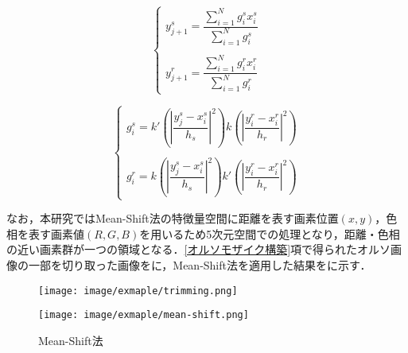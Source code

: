       \begin{equation}
        \label{Mean-Shift法2}
        \left\{
          \begin{array}{l}
            y_{j+1}^s = 
              \dfrac{\sum_{i=1}^{N} g_{i}^s x_{i}^s} {\sum_{i=1}^{N} g_{i}^s} \\ \\
            y_{j+1}^r = 
              \dfrac{\sum_{i=1}^{N} g_{i}^r x_{i}^r} {\sum_{i=1}^{N} g_{i}^r}
          \end{array}
        \right.
      \end{equation}

      \begin{equation}
        \label{Mean-Shift法3}
        \left\{
          \begin{array}{l}
            g_{i}^s = k' (|\dfrac{y_{j}^s - x_{i}^s} {h_{s}}|^2)
              k  (|\dfrac{y_{i}^r - x_{i}^r} {h_{r}}|^2) \\ \\
            g_{i}^r = k  (|\dfrac{y_{j}^s - x_{i}^s} {h_{s}}|^2) 
              k' (|\dfrac{y_{i}^r - x_{i}^r} {h_{r}}|^2)
          \end{array}
        \right.
      \end{equation}

      なお，本研究ではMean-Shift法の特徴量空間に距離を表す画素位置$(x,y)$，色相を表す画素値$(R,G,B)$を用いるため5次元空間での処理となり，距離・色相の近い画素群が一つの領域となる．\ref{オルソモザイク構築}項で得られたオルソ画像の一部を切り取った画像をに，Mean-Shift法を適用した結果をに示す．

      \begin{figure}[t]
        \begin{minipage}[c]{0.45\hsize}
          \centering
          \texttt{[image: image/exmaple/trimming.png]}
          \label{Mean−Shift法入力}
        \end{minipage}
        \begin{minipage}[c]{0.45\hsize}
          \centering
          \texttt{[image: image/exmaple/mean-shift.png]}
          \label{Mean-Shift法出力}
        \end{minipage}
        \caption{Mean-Shift法}
      \end{figure}


